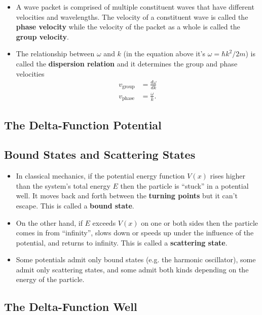 \documentclass{article}
\begin{document}
\begin{itemize}
  \item A wave packet is comprised of multiple constituent waves that have different velocities and wavelengths. The velocity of a constituent wave is called the \textbf{phase velocity} while the velocity of the packet as a whole is called the \textbf{group velocity}.

  \item The relationship between $\omega$ and $k$ (in the equation above it's $\omega = \hbar k^2 / 2 m$) is called the \textbf{dispersion relation} and it determines the group and phase velocities \begin{align*}
          v_\text{group} & = \frac{d \omega}{d k} \\
          v_\text{phase} & = \frac{\omega}{k}.
        \end{align*}
\end{itemize}

\subsection{The Delta-Function Potential}

\subsection{Bound States and Scattering States}

\begin{itemize}
  \item In classical mechanics, if the potential energy function $V(x)$ rises higher than the system's total energy $E$ then the particle is ``stuck'' in a potential well. It moves back and forth between the \textbf{turning points} but it can't escape. This is called a \textbf{bound state}.

  \item On the other hand, if $E$ exceeds $V(x)$ on one or both sides then the particle comes in from ``infinity'', slows down or speeds up under the influence of the potential, and returns to infinity. This is called a \textbf{scattering state}.

  \item Some potentials admit only bound states (e.g. the harmonic oscillator), some admit only scattering states, and some admit both kinds depending on the energy of the particle.
\end{itemize}

\subsection{The Delta-Function Well}
\end{document}

